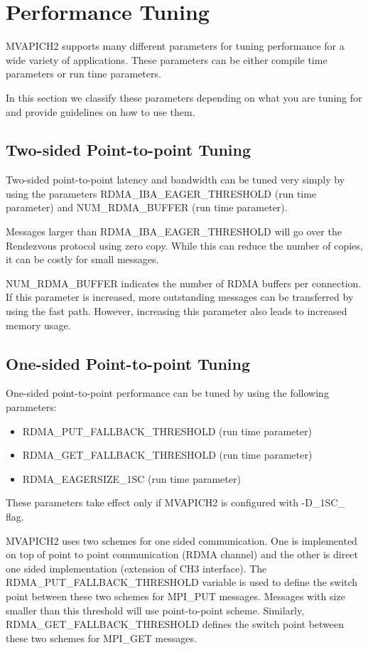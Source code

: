 \section{Performance Tuning}
\label{sec:performance-tuning}

MVAPICH2 supports many different parameters for tuning performance for a
wide variety of applications. These parameters can be either compile time
parameters or run time parameters.

In this section we classify these parameters depending on what you are tuning for 
and provide guidelines on how to use them.

\subsection{Two-sided Point-to-point Tuning}

Two-sided point-to-point latency and bandwidth can be tuned very simply by using the
parameters RDMA\_IBA\_EAGER\_THRESHOLD (run time parameter) and
NUM\_RDMA\_BUFFER (run time parameter).

Messages larger than RDMA\_IBA\_EAGER\_THRESHOLD will go over the
Rendezvous protocol using zero copy. While this can reduce the number of
copies, it can be costly for small messages.

NUM\_RDMA\_BUFFER indicates the number of RDMA buffers per
connection. If this parameter is increased, more outstanding messages
can be transferred by using the fast path. However, increasing this
parameter also leads to increased memory usage.

\subsection{One-sided Point-to-point Tuning}

One-sided point-to-point performance can be tuned by using the following parameters:

 \begin{itemize}
\item RDMA\_PUT\_FALLBACK\_THRESHOLD (run time parameter)
\item RDMA\_GET\_FALLBACK\_THRESHOLD (run time parameter)
\item RDMA\_EAGERSIZE\_1SC (run time parameter)
 \end{itemize}

These parameters take effect only if MVAPICH2 is
configured with -D\_1SC\_ flag.

MVAPICH2 uses two schemes for one sided communication. One is implemented
on top of point to point communication (RDMA channel) and the other is direct
one sided implementation (extension of CH3 interface). The RDMA\_PUT\_FALLBACK\_THRESHOLD
variable is
used to define the switch point between these two schemes for MPI\_PUT messages.
Messages with size smaller than this threshold will use point-to-point scheme.
Similarly, RDMA\_GET\_FALLBACK\_THRESHOLD defines the switch point
between these two schemes for MPI\_GET messages.


